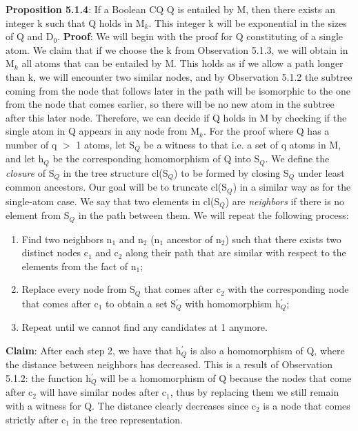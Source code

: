 \documentclass[11pt, a4paper, dvipsnames]{article}
\begin{document}
\textbf{Proposition 5.1.4}: If a Boolean CQ Q is entailed by M, then there exists an integer k such that Q holds in M$_{k}$. This integer k will be exponential in the sizes of Q and D$_{0}$.\newline
\textbf{Proof}: We will begin with the proof for Q constituting of a single atom. We claim that if we choose the k from Observation 5.1.3, we will obtain in M$_{k}$ all atoms that can be entailed by M. This holds as if we allow a path longer than k, we will encounter two similar nodes, and by Observation 5.1.2 the subtree coming from the node that follows later in the path will be isomorphic to the one from the node that comes earlier, so there will be no new atom in the subtree after this later node. Therefore, we can decide if Q holds in M by checking if the single atom in Q appears in any node from M$_{k}$.\newline
For the proof where Q has a number of q $>$ 1 atoms, let S$_{Q}$ be a witness to that i.e. a set of q atoms in M, and let h$_{Q}$ be the corresponding homomorphism of Q into S$_{Q}$. We define the \textit{closure} of S$_{Q}$ in the tree structure cl(S$_{Q}$) to be formed by closing S$_{Q}$ under least common ancestors. Our goal will be to truncate cl(S$_{Q}$) in a similar way as for the single-atom case. We say that two elements in cl(S$_{Q}$) are \textit{neighbors} if there is no element from S$_{Q}$ in the path between them. We will repeat the following process:
\begin{enumerate}
	\item Find two neighbors n$_{1}$ and n$_{2}$ (n$_{1}$ ancestor of n$_{2}$) such that there exists two distinct nodes c$_{1}$ and c$_{2}$ along their path that are similar with respect to the elements from the fact of n$_{1}$;
	\item Replace every node from S$_{Q}$ that comes after c$_{2}$ with the corresponding node that comes after c$_{1}$ to obtain a set S$^{'}_{Q}$ with homomorphism h$^{'}_{Q}$;
	\item Repeat until we cannot find any candidates at 1 anymore.
\end{enumerate}
\textbf{Claim}: After each step 2, we have that h$^{'}_{Q}$ is also a homomorphism of Q, where the distance between neighbors has decreased.\newline
This is a result of Observation 5.1.2: the function h$^{'}_{Q}$ will be a homomorphism of Q because the nodes that come after c$_{2}$ will have similar nodes after c$_{1}$, thus by replacing them we still remain with a witness for Q. The distance clearly decreases since c$_{2}$ is a node that comes strictly after c$_{1}$ in the tree representation.
\end{document}
